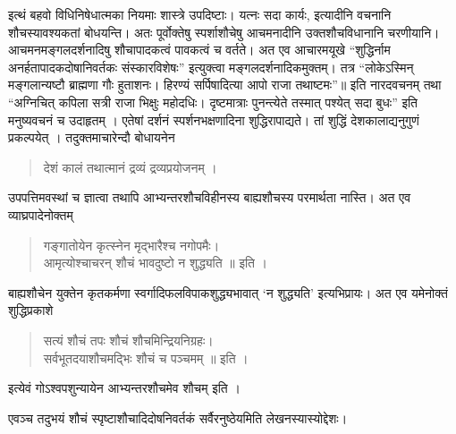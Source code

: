 इत्थं बहवो विधिनिषेधात्मका नियमाः शास्त्रे उपदिष्टाः। यत्नः सदा कार्यः, इत्यादीनि वचनानि शौचस्यावश्यकतां बोधयन्ति। अतः पूर्वोक्तेषु स्पर्शाशौचेषु आचमनादीनि उक्तशौचविधानानि चरणीयानि। आचमनमङ्गलदर्शनादिषु शौचापादकत्वं पावकत्वं च वर्तते। अत एव आचारमयूखे “शुद्धिर्नाम अनर्हतापादकदोषानिवर्तकः संस्कारविशेषः” इत्युक्त्वा मङ्गलदर्शनादिकमुक्तम्। तत्र “लोकेऽस्मिन् मङ्गलान्यष्टौ ब्राह्मणा गौः हुताशनः। हिरण्यं सर्पिषादित्या आपो राजा तथाष्टमः”॥ इति नारदवचनम् तथा “अग्निचित् कपिला सत्री राजा भिक्षुः महोदधिः। दृष्टमात्राः पुनन्त्येते तस्मात् पश्येत् सदा बुधः” इति मनुष्यवचनं च उदाहृतम् । एतेषां दर्शनं स्पर्शनभक्षणादिना शुद्धिरापाद्यते। तां शुद्धिं देशकालाद्यनुगुणं प्रकल्पयेत् । तदुक्तमाचारेन्दौ बोधायनेन 
\begin{verse}
देशं कालं तथात्मानं द्रव्यं द्रव्यप्रयोजनम् । 
\end{verse}
उपपत्तिमवस्थां च ज्ञात्वा तथापि आभ्यन्तरशौचविहीनस्य बाह्यशौचस्य परमार्थता नास्ति। अत एव व्याघ्रपादेनोक्तम् 
\begin{verse}
गङ्गातोयेन कृत्स्नेन मृद्भारैश्च नगोपमैः। \\
आमृत्योश्चाचरन् शौचं भावदुष्टो न शुद्ध्यति ॥ इति ।
\end{verse}
बाह्यशौचेन युक्तेन कृतकर्मणा स्वर्गादिफलविपाकशुद्ध्यभावात् ‘न शुद्ध्यति’ इत्यभिप्रायः। अत एव यमेनोक्तं शुद्धिप्रकाशे 
\begin{verse}
सत्यं शौचं तपः शौचं शौचमिन्द्रियनिग्रहः। \\
सर्वभूतदयाशौचमद्भिः शौचं च पञ्चमम् ॥ इति । 
\end{verse}
इत्येवं गोऽश्वपशुन्यायेन आभ्यन्तरशौचमेव शौचम् इति । 

एवञ्च तदुभयं शौचं स्पृष्टाशौचादिदोषनिवर्तकं सर्वैरनुष्ठेयमिति लेखनस्यास्योद्देशः।

\articleend

